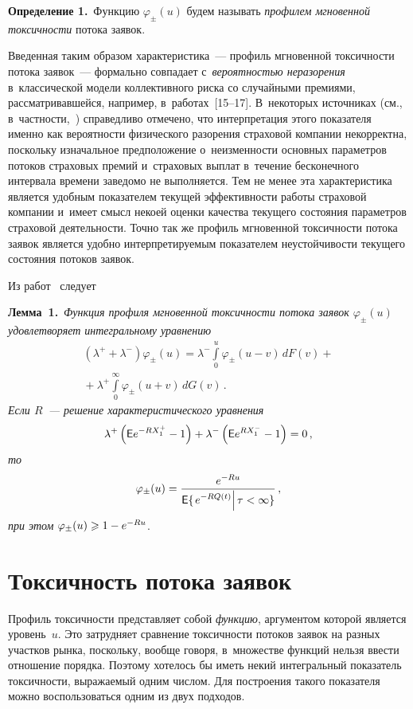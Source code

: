 \begin{multicols}{2}
\noindent
\textbf{Определение 1.}\
Функцию $\varphi_{\pm}(u)$ будем называть \textit{профилем мгновенной токсичности}
потока заявок.

\smallskip

Введенная таким образом характеристика~--- профиль мгновенной
токсичности потока заявок~--- формально совпадает с~{\it вероятностью
неразорения} в~классической модели коллективного риска со случайными
премиями, рассматривавшейся, например, в~работах~[15--17].
В~некоторых источниках (см., в~частности,~\cite{KorolevBeningShorgin2011})
справедливо отмечено, что
интерпретация этого показателя именно как вероятности физического
разорения страховой компании некорректна, поскольку изначальное
предположение о~неизменности основных параметров потоков страховых
премий и~страховых выплат в~течение бесконечного интервала времени
заведомо не выполняется. Тем не менее эта характеристика является
удобным показателем текущей эффективности работы страховой компании
и~имеет смысл некоей оценки качества текущего состояния параметров
страховой деятельности. Точно так же профиль мгновенной токсичности
потока заявок является удобно интерпретируемым показателем
неустойчивости текущего состояния потоков заявок.

Из работ~\cite{Boykov2002, Boykov2003} следует

\smallskip

\noindent
\textbf{Лемма~1.}\ \textit{Функция профиля мгновенной токсичности потока заявок
$\varphi_{\pm}(u)$ удовлетворяет интегральному уравнению
\begin{multline*}
\left(\lambda^+ + \lambda^-\right) \varphi_{\pm}(u) =
\lambda^- \int\limits_0^u \varphi_{\pm}(u - v)\,d F(v) + {}\\
{}+\lambda^+
\int\limits_0^{\infty} \varphi_{\pm}(u + v) \,d G(v)\,.
\end{multline*}
Если $R$~--- решение характеристического уравнения
$$
\lambda^+ \left({\sf E} e^{-R X^+_1} - 1\right) + \lambda^-
\left({\sf E} e^{R X^-_1} - 1\right) = 0\,,
$$
то
$$
\varphi_{\pm}(u) = \displaystyle\frac{\displaystyle e^{-R u}\mathstrut}{\displaystyle {\sf E} \{\left. e^{-R Q(t)}\right\vert \tau < \infty\}\mathstrut}\,,
$$
при этом} $\varphi_{\pm}(u) \hm\geqslant 1 - e^{-Ru}$.


\section{Токсичность потока заявок}

Профиль токсичности представляет собой {\it функцию}, аргументом
которой является уровень~$u$. Это затрудняет сравнение токсичности
потоков заявок на разных участков рынка, поскольку, вообще говоря,
в~множестве функций
нельзя ввести отношение порядка. Поэтому хотелось бы иметь некий
интегральный показатель токсичности, выражаемый одним числом. Для
построения такого показателя можно воспользоваться одним из двух подходов.


\end{multicols}
